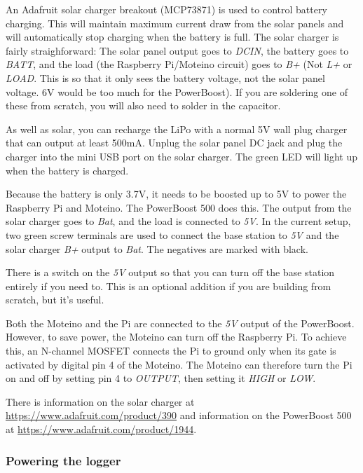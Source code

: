 \documentclass[10pt]{article}
\begin{document}
An Adafruit solar charger breakout (MCP73871) is used to control battery charging. This will maintain maximum current draw from the solar panels and will automatically stop charging when the battery is full. The solar charger is fairly straighforward: The solar panel output goes to \textit{DCIN}, the battery goes to \textit{BATT}, and the load (the Raspberry Pi/Moteino circuit) goes to \textit{B+} (Not \textit{L+} or \textit{LOAD}. This is so that it only sees the battery voltage, not the solar panel voltage. 6V would be too much for the PowerBoost). If you are soldering one of these from scratch, you will also need to solder in the capacitor.

As well as solar, you can recharge the LiPo with a normal 5V wall plug charger that can output at least 500mA. Unplug the solar panel DC jack and plug the charger into the mini USB port on the solar charger. The green LED will light up when the battery is charged. 

Because the battery is only 3.7V, it needs to be boosted up to 5V to power the Raspberry Pi and Moteino. The PowerBoost 500 does this. The output from the solar charger goes to \textit{Bat}, and the load is connected to \textit{5V}. In the current setup, two green screw terminals are used to connect the base station to \textit{5V} and the solar charger \textit{B+} output to \textit{Bat}. The negatives are marked with black.

There is a switch on the \textit{5V} output so that you can turn off the base station entirely if you need to. This is an optional addition if you are building from scratch, but it's useful.

Both the Moteino and the Pi are connected to the \textit{5V} output of the PowerBoost. However, to save power, the Moteino can turn off the Raspberry Pi. To achieve this, an N-channel MOSFET connects the Pi to ground only when its gate is activated by digital pin 4 of the Moteino. The Moteino can therefore turn the Pi on and off by setting pin 4 to \textit{OUTPUT}, then setting it \textit{HIGH} or \textit{LOW}.

There is information on the solar charger at \url{https://www.adafruit.com/product/390} and information on the PowerBoost 500 at \url{https://www.adafruit.com/product/1944}.

\subsubsection{Powering the logger}
\end{document}
